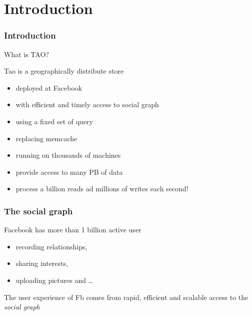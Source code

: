 \section{Introduction}
\begin{frame}[t]
\frametitle{Introduction}
What is TAO?

\begin{block}{Tao}
	is a geographically distribute store
	\begin{itemize}
		\item deployed at Facebook
	 	\item with efficient and timely access to social graph
	 	\item using a fixed set of query
	 	\item replacing memcache
	 	\item running on thousands of machines
	 	\item provide access to many PB of data
	 	\item process a billion reads ad millions of writes each second!
	 \end{itemize} 
\end{block}
\end{frame}

\begin{frame}
\frametitle{The social graph}
Facebook has more than 1 billion active user 
\begin{itemize}
	\item recording relationships,
	\item sharing interests,
	\item uploading pictures and \dots
\end{itemize}

The user experience of Fb comes from rapid, efficient and scalable access to the \emph{social graph}


    


\end{frame}